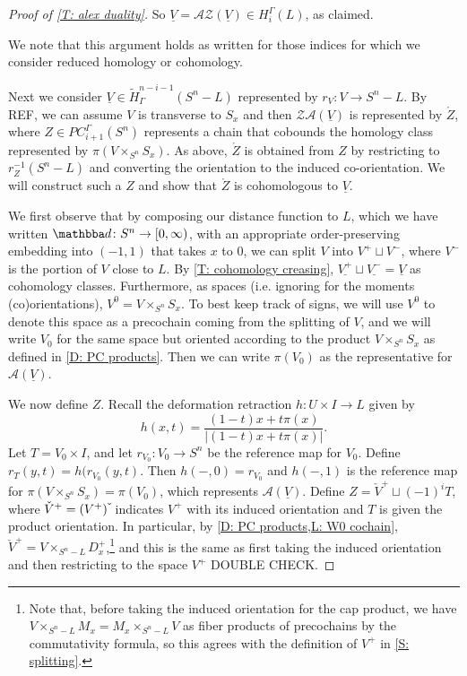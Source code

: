 \documentclass[12pt]{article}
\theoremstyle{plain}
\theoremstyle{definition}
\theoremstyle{remark}
\newcommand{\uV}{\underline{V}}
\newcommand{\td}[1]{\tilde{#1}}
\newcommand{\mr}[1]{\mathring{#1}}
\newcommand{\mc}[1]{\mathcal{#1}}
\begin{document}
\begin{proof}[Proof of \cref{T: alex duality}]
So $\uV = \mc A \mc Z(\uV) \in H_i^\Gamma(L)$, as claimed.

We note that this argument holds as written for those indices for which we consider reduced homology or cohomology.

Next we consider $\uV \in \td H^{n-i-1}_\Gamma(S^n-L)$ represented by $r_V \colon V \to S^n-L$.
By REF, we can assume $V$ is transverse to $S_x$ and then $\mc Z \mc A(\uV)$ is represented by $\mr Z$, where $Z \in PC_{i+1}^\Gamma(S^n)$ represents a chain that cobounds the homology class represented by $\pi(V \times_{S^n} S_x)$.
As above, $\mr Z$ is obtained from $Z$ by restricting to $r_Z^{-1}(S^n-L)$ and converting the orientation to the induced co-orientation.
We will construct such a $Z$ and show that $\mr Z$ is cohomologous to $\uV$.

We first observe that by composing our distance function to $L$, which we have written $\mathbba d \colon S^n \to [0,\infty)$, with an appropriate order-preserving embedding into $(-1,1)$ that takes $x$ to $0$, we can split $V$ into $V^+ \sqcup V^-$, where $V^-$ is the portion of $V$ close to $L$.
By \cref{T: cohomology creasing}, $\underline{V^+} \sqcup \underline{V^-} = \uV$ as cohomology classes.
Furthermore, as spaces (i.e. ignoring for the moments (co)orientations), $V^0 = V \times_{S^n} S_x$.
To best keep track of signs, we will use $V^0$ to denote this space as a precochain coming from the splitting of $V$, and we will write $V_0$ for the same space but oriented according to the product $V \times_{S^n} S_x$ as defined in \cref{D: PC products}.
Then we can write $\pi(V_0)$ as the representative for $\mc A(\uV)$.

\begin{comment}
Let us determine the relationship between $V_0$ and $(V^0)\,\check{\vrule height1.3ex width0pt}$ COME BACK IF WE NEED THIS
\end{comment}

We now define $Z$.
Recall the deformation retraction $h \colon U \times I \to L$ given by $$h(x,t) = \frac{(1-t)x + t\pi(x)}{|(1-t)x + t\pi(x) |}.$$
Let $T = V_0 \times I$, and let $r_{V_0} \colon V_0 \to S^n$ be the reference map for $V_0$.
Define $r_T(y,t) = h(r_{V_0}(y,t)$.
Then $h(-,0) = r_{V_0}$ and $h(-,1)$ is the reference map for $\pi(V \times_{S^n} S_x) = \pi(V_0)$, which represents $\mc A(\uV)$.
Define $Z = \check V^+ \sqcup (-1)^i T$, where $\check V^+ = (V^+)\,\check{\vrule height1.3ex width0pt}$ indicates $V^+$ with its induced orientation and $T$ is given the product orientation.
In particular, by \cref{D: PC products,L: W0 cochain},  $\check V^+ = V \times_{S^n-L} D_x^+$,\footnote{Note that, before taking the induced orientation for the cap product, we have $V \times_{S^n-L} M_x = M_x \times_{S^n-L} V$ as fiber products of precochains by the commutativity formula, so this agrees with the definition of $V^+$ in \cref{S: splitting}.} and this is the same as first taking the induced orientation and then restricting to the space $V^+$ DOUBLE CHECK.


\end{proof}
\end{document}

